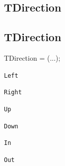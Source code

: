 \documentclass{report}
\newif\ifpdf
\begin{document}
\subsection*{\large{\textbf{TDirection}}\normalsize\hspace{1ex}\hrulefill}
\else
\subsection*{TDirection}
\fi
\label{ok_out_enum-TDirection}
\begin{list}{}{
\setlength{\itemindent}{0cm}
\setlength{\listparindent}{0cm}
\setlength{\leftmargin}{\evensidemargin}
\addtolength{\leftmargin}{\tmplength}
\settowidth{\labelsep}{X}
\addtolength{\leftmargin}{\labelsep}
\setlength{\labelwidth}{\tmplength}
}
\item[\textbf{Declaration}\hfill]
\ifpdf
\begin{flushleft}
\fi
\begin{ttfamily}
TDirection = (...);\end{ttfamily}

\ifpdf
\end{flushleft}
\fi

\par
\item[\textbf{Description}]
 \item[\textbf{Values}]
\begin{description}
\item[\texttt{Left}] \label{ok_out_enum-Left}
\index{}
 
\item[\texttt{Right}] \label{ok_out_enum-Right}
\index{}
 
\item[\texttt{Up}] \label{ok_out_enum-Up}
\index{}
 
\item[\texttt{Down}] \label{ok_out_enum-Down}
\index{}
 
\item[\texttt{In}] \label{ok_out_enum-In}
\index{}
 
\item[\texttt{Out}] \label{ok_out_enum-Out}
\index{}
 
\end{description}


\end{list}
\end{document}
